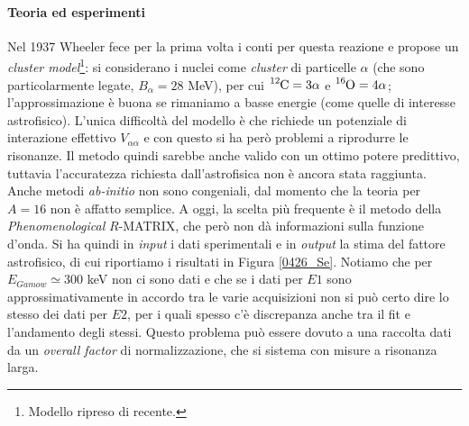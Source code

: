\paragraph{Teoria ed esperimenti}
Nel 1937 Wheeler fece per la prima volta i conti per questa reazione e propose un \textit{cluster model}\footnote{Modello ripreso di recente.}: si considerano i nuclei come \textit{cluster} di particelle $\alpha$ (che sono particolarmente legate, $B_\alpha = 28$ MeV), per cui $\ce{^{12}C}=3\alpha$ e $\ce{^{16}O}=4\alpha$; l'approssimazione è buona se rimaniamo a basse energie (come quelle di interesse astrofisico).  
L'unica difficoltà del modello è che richiede un potenziale di interazione effettivo $V_{\alpha \alpha}$ e con questo si ha però problemi a riprodurre le risonanze. Il metodo quindi sarebbe anche valido con un ottimo potere predittivo, tuttavia l'accuratezza richiesta dall'astrofisica non è ancora stata raggiunta.\\ 
Anche metodi \textit{ab-initio} non sono congeniali, dal momento che la teoria per $A=16$ non è affatto semplice. A oggi, la scelta più frequente è il metodo della \textit{Phenomenological} $R$-MATRIX, che però non dà informazioni sulla funzione d'onda.
Si ha quindi in \textit{input} i dati sperimentali e in \textit{output} la stima del fattore astrofisico, di cui riportiamo i risultati in Figura \ref{0426_Se}. Notiamo che per $E_{Gamow} \simeq 300$ keV non ci sono dati e che se i dati per $E1$ sono approssimativamente in accordo tra le varie acquisizioni non si può certo dire lo stesso dei dati per $E2$, per i quali spesso c'è discrepanza anche tra il fit e l'andamento degli stessi. Questo problema può essere dovuto a una raccolta dati  da un \textit{overall factor} di normalizzazione, che si sistema con misure a risonanza larga. %

